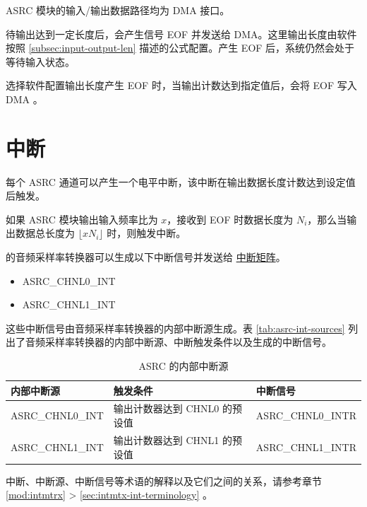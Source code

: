 \documentclass[main\_\_CN.tex]{subfiles}
\begin{document}
ASRC 模块的输入/输出数据路径均为 DMA 接口。

待输出达到一定长度后，会产生信号 EOF 并发送给 DMA。这里输出长度由软件按照 \ref{subsec:input-output-len} \textit{} 描述的公式配置。产生 EOF 后，系统仍然会处于等待输入状态。

选择软件配置输出长度产生 EOF 时，当输出计数达到指定值后，会将 EOF 写入 DMA 。


\section{中断}

每个 ASRC 通道可以产生一个电平中断，该中断在输出数据长度计数达到设定值后触发。

如果 ASRC 模块输出输入频率比为 $x$，接收到 EOF 时数据长度为 $N_i$，那么当输出数据总长度为 $\lfloor xN_i\rfloor$ 时，则触发中断。

\chipname{} 的音频采样率转换器可以生成以下中断信号并发送给 \hyperref[mod:intmtrx]{中断矩阵}。

    \begin{itemize}
        \item ASRC\_CHNL0\_INT
        \item ASRC\_CHNL1\_INT
    \end{itemize}

这些中断信号由音频采样率转换器的内部中断源生成。表 \ref{tab:asrc-int-sources} 列出了音频采样率转换器的内部中断源、中断触发条件以及生成的中断信号。

\begin{longtable}{ | L{5cm} | L{6.5cm} | L{4cm} | }
\caption{ASRC 的内部中断源} \label{tab:asrc-int-sources}
\\ \hline
{}
\textbf{内部中断源} & \textbf{触发条件}  &  \textbf{中断信号}\\ \hline
\label{int:ASRCCHNL0INT} ASRC\_CHNL0\_INT &  输出计数器达到 CHNL0 的预设值 &  ASRC\_CHNL0\_INTR  \\ \hline
\label{int:ASRCCHNL1INT} ASRC\_CHNL1\_INT &  输出计数器达到 CHNL1 的预设值 & ASRC\_CHNL1\_INTR \\ \hline
\end{longtable}

\begin{tiplisting}
中断、中断源、中断信号等术语的解释以及它们之间的关系，请参考章节 \ref{mod:intmtrx} \textit{} > \ref{sec:intmtx-int-terminology} \textit{}。
\end{tiplisting}
\end{document}
